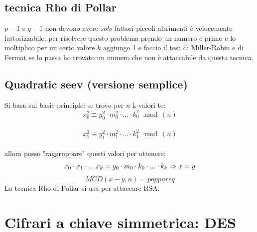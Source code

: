 \documentclass[10pt,a4paper]{article}
\begin{document}
\subsection{tecnica Rho di Pollar}
$p-1$ e $q-1$ non devono avere \textit{solo} fattori piccoli altrimenti è velocemente fattorizzabile, per risolvere questo problema prendo un numero c primo e lo moltiplico per un certo valore $k$ aggiungo 1 e faccio il test di Miller-Rabin e di Fermat se lo passa ho trovato un numero che non è attaccabile da questa tecnica.
\subsection{Quadratic seev (versione semplice)}
Si basa sul basic principle: se trovo per $n$ k valori tc:\\
$$x_0^2\equiv y_0^2\cdot m_0^2 \cdot ... \cdot k_0^2 \mod(n)$$ \\
$$x_1^2\equiv y_1^2\cdot m_1^2 \cdot ... \cdot k_1^2 \mod(n)$$ \\
allora posso "raggruppare" questi valori per ottenere:
$$
x_0\cdot x_1 \cdot .... x_k = y_0 \cdot m_0 \cdot k_0 \cdot ... \cdot k_k\\
\Rightarrow \\
x = y\\
$$
$$MCD(x-y,n)=p oppure q
$$
La tecnica Rho di Pollar si usa per attaccare RSA.
\section{Cifrari a chiave simmetrica: DES}
\end{document}
